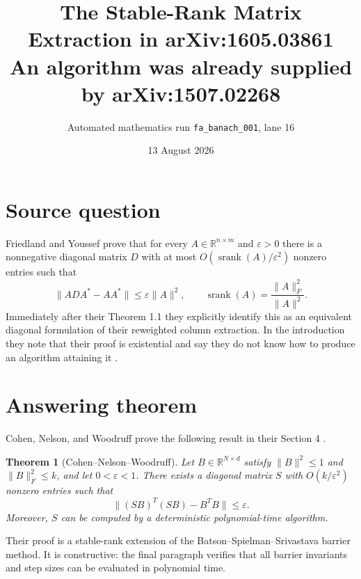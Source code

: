 \documentclass[11pt]{article}
\title{The Stable-Rank Matrix Extraction in arXiv:1605.03861\\
\large An algorithm was already supplied by arXiv:1507.02268}
\author{Automated mathematics run \texttt{fa\_banach\_001}, lane 16}
\date{13 August 2026}
\newtheorem{theorem}{Theorem}
\newcommand{\R}{\mathbb R}
\begin{document}
\maketitle

\begin{center}
\end{center}

\section{Source question}

Friedland and Youssef prove that for every $A\in\R^{n\times m}$ and
$\varepsilon>0$ there is a nonnegative diagonal matrix $D$ with at most
$O(\operatorname{srank}(A)/\varepsilon^2)$ nonzero entries such that
\begin{equation}\label{eq:source}
 \|ADA^*-AA^*\|\le\varepsilon\|A\|^2,
 \qquad
 \operatorname{srank}(A)=\frac{\|A\|_F^2}{\|A\|^2}.
\end{equation}
Immediately after their Theorem 1.1 they explicitly identify this as an
equivalent diagonal formulation of their reweighted column extraction.  In
the introduction they note that their proof is existential and say they do
not know how to produce an algorithm attaining it \cite{FY}.

\section{Answering theorem}

Cohen, Nelson, and Woodruff prove the following result in their Section 4
\cite[Theorem 5]{CNW}.

\begin{theorem}[Cohen--Nelson--Woodruff]
Let $B\in\R^{N\times d}$ satisfy $\|B\|^2\le1$ and
$\|B\|_F^2\le k$, and let $0<\varepsilon<1$.  There exists a diagonal
matrix $S$ with $O(k/\varepsilon^2)$ nonzero entries such that
\begin{equation}\label{eq:cnw}
 \|(SB)^T(SB)-B^TB\|\le\varepsilon.
\end{equation}
Moreover, $S$ can be computed by a deterministic polynomial-time algorithm.
\end{theorem}

Their proof is a stable-rank extension of the Batson--Spielman--Srivastava
barrier method.  It is constructive: the final paragraph verifies that all
barrier invariants and step sizes can be evaluated in polynomial time.
\end{document}
